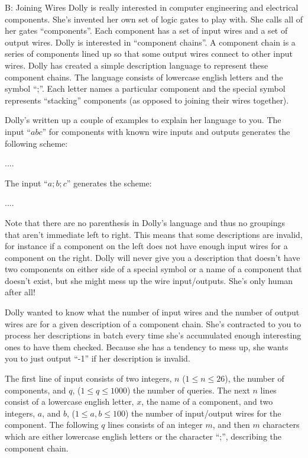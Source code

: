 \begin{problem}{B: Joining Wires}
Dolly is really interested in computer engineering and electrical components.
She's invented her own set of logic gates to play with.
She calls all of her gates ``components''.
Each component has a set of input wires and a set of output wires.
Dolly is interested in ``component chains''.
A component chain is a series of components lined up so that some output wires connect to other input wires.
Dolly has created a simple description language to represent these component chains.
The language consists of lowercase english letters and the symbol ``;''.
Each letter names a particular component and the special symbol represents ``stacking'' components (as opposed to joining their wires together).

Dolly's written up a couple of examples to explain her language to you.
The input ``$a b c$'' for components with known wire inputs and outputs generates the following scheme:

....

The input ``$a ; b ; c$'' generates the scheme:

....

Note that there are no parenthesis in Dolly's language and thus no groupings that aren't immediate left to right.
This means that some descriptions are invalid, for instance if a component on the left does not have enough input wires for a component on the right.
Dolly will never give you a description that doesn't have two components on either side of a special symbol or a name of a component that doesn't exist, but she might mess up the wire input/outputs.
She's only human after all!

Dolly wanted to know what the number of input wires and the number of output wires are for a given description of a component chain.
She's contracted to you to process her descriptions in batch every time she's accumulated enough interesting ones to have them checked.
Because she has a tendency to mess up, she wants you to just output ``-1'' if her description is invalid.
\end{problem}

\begin{formalin}
The first line of input consists of two integers, $n$ ($1 \leq n \leq 26$), the number of components, and $q$, ($1 \leq q \leq 1000$) the number of queries.
The next $n$ lines consist of a lowercase english letter, $x$, the name of a component, and two integers, $a$, and $b$, ($1 \leq a, b \leq 100$) the number of input/output wires for the component.
The following $q$ lines consists of an integer $m$, and then $m$ characters which are either lowercase english letters or the character ``;'', describing the component chain.
\end{formalin}

